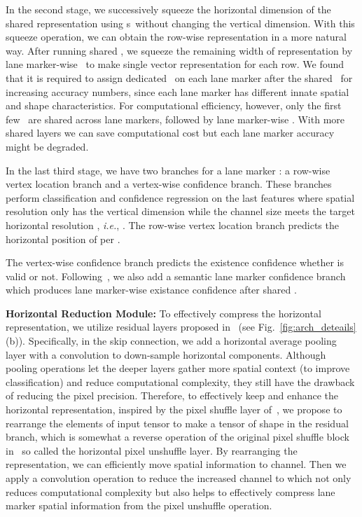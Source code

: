 \documentclass[10pt,twocolumn,letterpaper]{article}
\begin{document}
In the second stage, we successively squeeze the horizontal dimension of the shared representation using \reductionname s\ without changing the vertical dimension. With this squeeze operation, we can obtain the row-wise representation in a more natural way. After running shared \reductionnames, we squeeze the remaining width of representation by lane marker-wise \reductionnames\ to make single vector representation for each row. We found that it is required to assign dedicated \reductionnames\ on each lane marker after the shared \reductionnames\ for increasing accuracy numbers, since each lane marker has different innate spatial and shape characteristics. For computational efficiency, however, only the first few \reductionnames\ are shared across lane markers, followed by lane marker-wise \reductionnames. With more shared layers we can save computational cost but each lane marker accuracy might be degraded. 

In the last third stage, we have two branches for a lane marker : a row-wise vertex location branch and a vertex-wise confidence branch. These branches perform classification and confidence regression on the last \reductionnames features where spatial resolution only has the vertical dimension while the channel size meets the target horizontal resolution , \textit{i.e.}, . The row-wise vertex location branch predicts the horizontal position  of  per  .

The vertex-wise confidence branch predicts the existence confidence  whether  is valid or not. Following~\cite{SpatialAsDeep}, we also add a semantic lane marker confidence branch which produces lane marker-wise existance confidence  after shared \reductionnames.


\textbf{Horizontal Reduction Module:} To effectively compress the horizontal representation, we utilize residual layers proposed in~\cite{Residual} (see Fig.~\ref{fig:arch_deteails}(b)). Specifically, in the skip connection, we add a horizontal average pooling layer with a  convolution to down-sample horizontal components. Although pooling operations let the deeper layers gather more spatial context (to improve classification) and reduce computational complexity, they still have the drawback of reducing the pixel precision. Therefore, to effectively keep and enhance the horizontal representation, inspired by the pixel shuffle layer of~\cite{Shuffle, shuffle2}, we propose to rearrange the elements of  input tensor to make a tensor of shape  in the residual branch, which is somewhat a reverse operation of the original pixel shuffle block in~\cite{Shuffle} so called the horizontal pixel unshuffle layer. By rearranging the representation, we can efficiently move spatial information to channel. Then we apply a convolution operation to reduce the increased channel  to  which not only reduces computational complexity but also helps to effectively compress lane marker spatial information from the pixel unshuffle operation.
\end{document}
